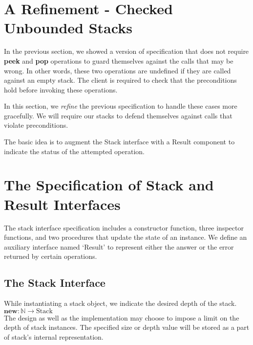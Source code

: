 \documentclass[10pt]{article}
\begin{document}

\section{A Refinement - Checked Unbounded Stacks}
\noindent In the previous section, we showed a version of specification that does not require \textbf{peek} and \textbf{pop} operations to guard themselves against the calls that may be wrong. In other words, these two operations are undefined if they are called against an empty stack. The client is required to check that the preconditions hold before invoking these operations.

In this section, we \emph{refine} the previous specification to handle these cases more gracefully. We will require our stacks to defend themselves against calls that violate preconditions.

The basic idea is to augment the Stack interface with a Result component to indicate the status of the attempted operation.  







\section{The Specification of Stack and Result Interfaces}
  \noindent The stack interface specification includes a constructor function, three inspector functions, and two procedures that update the state of an instance. We define an auxiliary interface named `Result' to represent either the answer or the error returned by certain operations.   
  
  \subsection{The Stack Interface}
  \noindent While instantiating a stack object, we indicate the desired depth of the stack. 
  \vspace*{6pt}\\\hspace*{32pt}\(
  \textbf{new}: \mathbb{N} \rightarrow \mathrm{Stack}
  \)\vspace*{6pt}\\
  The design as well as the implementation may choose to impose a limit on the depth of stack instances. The specified size or depth value will be stored as a part of stack's internal representation.  
\end{document}
